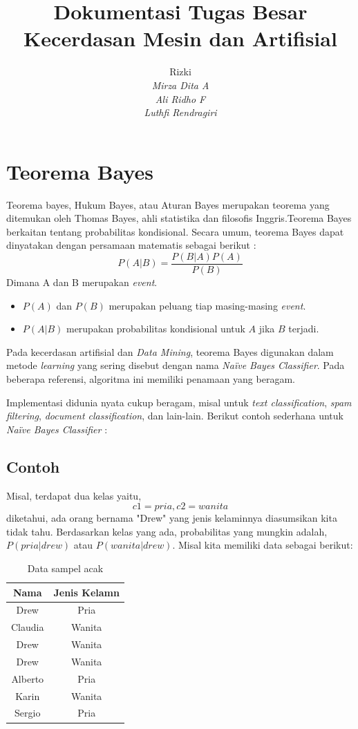 \documentclass[11pt,a4paper]{report}
\author{
	Rizki\\
	\textit{Mirza Dita A}\\
	\textit{Ali Ridho F}\\
	\textit{Luthfi Rendragiri}\\
}
\title{
	\textbf{Dokumentasi Tugas Besar}\\
	\textbf{Kecerdasan Mesin dan Artifisial}
}
\begin{document}
	\maketitle
	\section*{Teorema Bayes}
	Teorema bayes, Hukum Bayes, atau Aturan Bayes merupakan teorema yang ditemukan oleh Thomas Bayes, ahli statistika dan filosofis Inggris.Teorema Bayes berkaitan tentang probabilitas kondisional. Secara umum, teorema Bayes dapat dinyatakan dengan persamaan matematis sebagai berikut :
	\[ P(A|B)=\frac{P(B|A)P(A)}{P(B)} \]
	Dimana A dan B merupakan \emph{event}.
	\begin{itemize}
		\item $P(A)$ dan $P(B)$ merupakan peluang tiap masing-masing \emph{event}.
		\item $P(A|B)$ merupakan probabilitas kondisional untuk $A$ jika $B$ terjadi.
	\end{itemize} 
	
	Pada kecerdasan artifisial dan \emph{Data Mining}, teorema Bayes digunakan dalam metode \emph{learning} yang sering disebut dengan nama \emph{Na\"{i}ve Bayes Classifier}. Pada beberapa referensi, algoritma ini memiliki penamaan yang beragam.
	
	Implementasi didunia nyata cukup beragam, misal untuk \emph{text classification}, \emph{spam filtering}, \emph{document classification}, dan lain-lain. Berikut contoh sederhana untuk \emph{Na\"{i}ve Bayes Classifier} : 
	\subsection*{Contoh}
	Misal, terdapat dua kelas yaitu,
	\[ c1=pria, c2=wanita \]
	diketahui, ada orang bernama "Drew" yang jenis kelaminnya diasumsikan kita tidak tahu. Berdasarkan kelas yang ada, probabilitas yang mungkin adalah, $P(pria|drew)$ atau $P(wanita|drew)$.
	Misal kita memiliki data sebagai berikut:
	
	\begin{table}[h]
		\centering
		\begin{tabular}{|c|c|}
			\hline Nama & Jenis Kelamn \\ 
			\hline Drew & Pria \\ 
			\hline Claudia & Wanita \\ 
			\hline Drew & Wanita \\ 
			\hline Drew & Wanita \\ 
			\hline Alberto & Pria \\ 
			\hline Karin & Wanita \\ 
			\hline Sergio & Pria \\ 
			\hline 
		\end{tabular}
		\caption{Data sampel acak}
	\end{table} 
	
\end{document}
